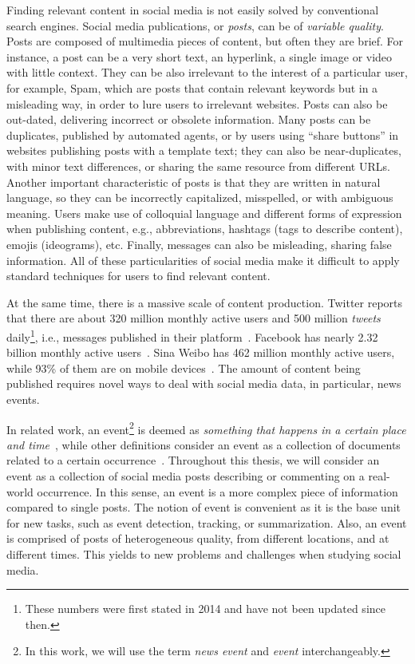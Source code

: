 Finding relevant content in social media is not easily solved by conventional
search engines.
%
Social media publications, or {\em posts}, can be of {\em variable quality}.
%
Posts are composed of multimedia pieces of content, but often they are brief.
%
For instance, a post can be a very short text, an hyperlink, a single image or
video with little context.
%
They can be also irrelevant to the interest of a particular user, for example,
Spam, which are posts that contain relevant keywords but in a misleading way, in
order to lure users to irrelevant websites. 
%
Posts can also be out-dated, delivering incorrect or obsolete information. 
%
Many posts can be duplicates, published by automated agents, or by users
using ``share buttons'' in websites publishing posts with a template text; 
%
they can also be near-duplicates, with minor text differences, or sharing the
same resource from different URLs.
%
Another important characteristic of posts is that they are written in natural
language, so they can be incorrectly capitalized, misspelled, or with ambiguous
meaning.
%
Users make use of colloquial language and different forms of expression when
publishing content, e.g., abbreviations, hashtags (tags to describe content),
emojis (ideograms), etc.
%
Finally, messages can also be misleading, sharing false information.
%
All of these particularities of social media make it difficult to apply standard
techniques for users to find relevant content.


At the same time, there is a massive scale of content production.
%
Twitter reports that there are about 320 million monthly active users and 500
million {\em tweets} daily\footnote{These numbers were first stated in 2014 and
have not been updated since then.}, i.e., messages published in their
platform~\cite{twitter2014}. 
%
Facebook has nearly 2.32 billion monthly active users~\cite{fbnewsroom}. 
%
Sina Weibo has 462 million monthly active users, while 93\% of them are on
mobile devices~\cite{chinawatch}.
%
The amount of content being published requires novel ways to deal with social
media data, in particular, news events.



%
In related work, an event\footnote{In this work, we will use the term {\em news
event} and {\em event} interchangeably.} is deemed as {\em something that happens
in a certain place and time}~\cite{yang1999learning}, while other definitions
consider an event as a collection of documents related to a certain
occurrence~\cite{Becker:2010:LSM:1718487.1718524}.
%
Throughout this thesis, we will consider an event as a collection of
social media posts describing or commenting on a real-world occurrence.
%
In this sense, an event is a more complex piece of information compared to
single posts.
%
The notion of event is convenient as it is the base unit for new tasks, such as
event detection, tracking, or summarization.
%
Also, an event is comprised of posts of heterogeneous quality, from different
locations, and at different times.
%
This yields to new problems and challenges when studying social media.

